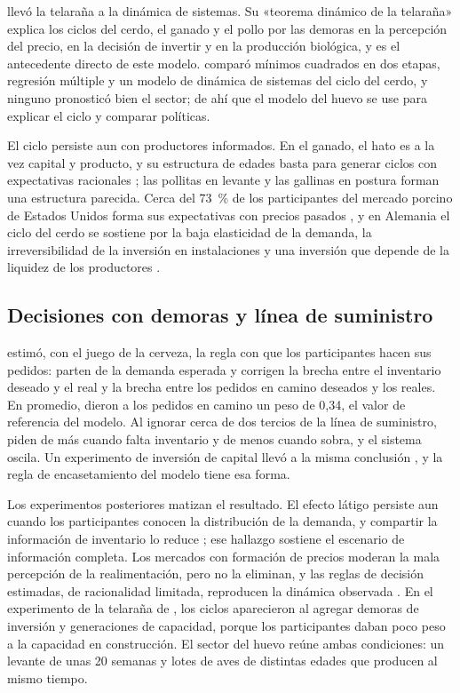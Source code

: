 \documentclass[preprint,12pt,authoryear]{elsarticle}
\begin{document}
\citet{Meadows1969} llevó la telaraña a la dinámica de sistemas. Su «teorema dinámico de la telaraña» explica los ciclos del cerdo, el ganado y el pollo por las demoras en la percepción del precio, en la decisión de invertir y en la producción biológica, y es el antecedente directo de este modelo. \citet{Fisher1974} comparó mínimos cuadrados en dos etapas, regresión múltiple y un modelo de dinámica de sistemas del ciclo del cerdo, y ninguno pronosticó bien el sector; de ahí que el modelo del huevo se use para explicar el ciclo y comparar políticas.

El ciclo persiste aun con productores informados. En el ganado, el hato es a la vez capital y producto, y su estructura de edades basta para generar ciclos con expectativas racionales \citep{Rosen1994}; las pollitas en levante y las gallinas en postura forman una estructura parecida. Cerca del 73~\% de los participantes del mercado porcino de Estados Unidos forma sus expectativas con precios pasados \citep{Chavas1999}, y en Alemania el ciclo del cerdo se sostiene por la baja elasticidad de la demanda, la irreversibilidad de la inversión en instalaciones y una inversión que depende de la liquidez de los productores \citep{BergHuffaker2015}.

\subsection{Decisiones con demoras y línea de suministro}
\label{sec2.3}

\citet{Sterman1989b} estimó, con el juego de la cerveza, la regla con que los participantes hacen sus pedidos: parten de la demanda esperada y corrigen la brecha entre el inventario deseado y el real y la brecha entre los pedidos en camino deseados y los reales. En promedio, dieron a los pedidos en camino un peso de 0,34, el valor de referencia del modelo. Al ignorar cerca de dos tercios de la línea de suministro, piden de más cuando falta inventario y de menos cuando sobra, y el sistema oscila. Un experimento de inversión de capital llevó a la misma conclusión \citep{Sterman1989a}, y la regla de encasetamiento del modelo tiene esa forma.

Los experimentos posteriores matizan el resultado. El efecto látigo persiste aun cuando los participantes conocen la distribución de la demanda, y compartir la información de inventario lo reduce \citep{CrosonDonohue2006}; ese hallazgo sostiene el escenario de información completa. Los mercados con formación de precios moderan la mala percepción de la realimentación, pero no la eliminan, y las reglas de decisión estimadas, de racionalidad limitada, reproducen la dinámica observada \citep{Kampmann1992,KampmannSterman2014}. En el experimento de la telaraña de \citet{ArangoMoxnes2012}, los ciclos aparecieron al agregar demoras de inversión y generaciones de capacidad, porque los participantes daban poco peso a la capacidad en construcción. El sector del huevo reúne ambas condiciones: un levante de unas 20 semanas y lotes de aves de distintas edades que producen al mismo tiempo.
\end{document}
